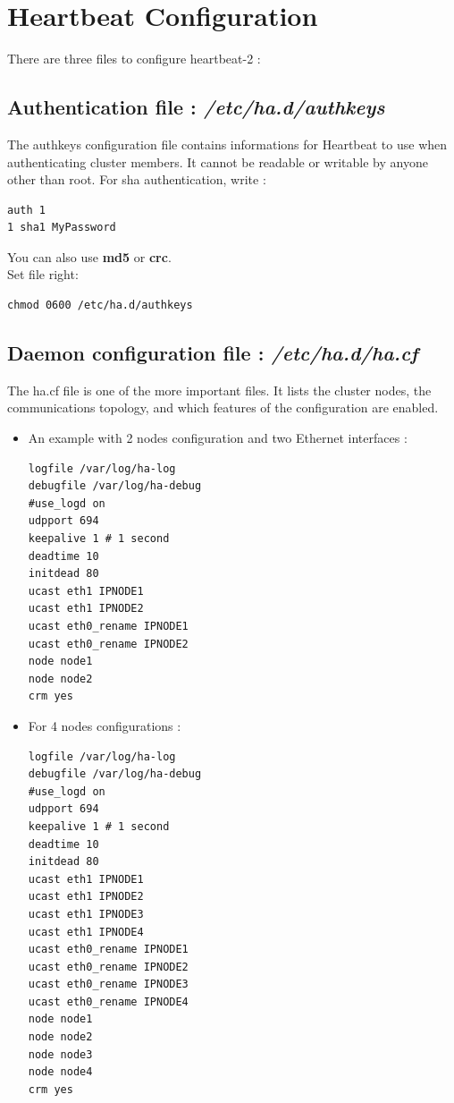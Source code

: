 \documentclass[a4paper,10pt]{report}
\begin{document}
\section{Heartbeat Configuration}

There are three files to configure heartbeat-2 :
\subsection{Authentication file : \textit{/etc/ha.d/authkeys}}
The authkeys configuration file contains informations for Heartbeat to use when authenticating cluster members. It cannot be readable or writable by anyone other than root. For sha authentication, write :
\begin{lstlisting}
auth 1
1 sha1 MyPassword
\end{lstlisting}
You can also use \textbf{md5} or \textbf{crc}.\\
Set file right:
\begin{lstlisting}
chmod 0600 /etc/ha.d/authkeys
\end{lstlisting}

\subsection{Daemon configuration file : \textit{/etc/ha.d/ha.cf}}

The ha.cf file is one of the more important files. It lists the cluster nodes, the communications topology, and which features of the configuration are enabled. 
\begin{itemize}
\item An example with 2 nodes configuration and two Ethernet interfaces :
\begin{lstlisting}
logfile /var/log/ha-log
debugfile /var/log/ha-debug
#use_logd on
udpport 694
keepalive 1 # 1 second
deadtime 10
initdead 80
ucast eth1 IPNODE1
ucast eth1 IPNODE2
ucast eth0_rename IPNODE1
ucast eth0_rename IPNODE2
node node1
node node2
crm yes
\end{lstlisting}

\item For 4 nodes configurations :
\begin{lstlisting}
logfile /var/log/ha-log
debugfile /var/log/ha-debug
#use_logd on
udpport 694
keepalive 1 # 1 second
deadtime 10
initdead 80
ucast eth1 IPNODE1
ucast eth1 IPNODE2
ucast eth1 IPNODE3
ucast eth1 IPNODE4
ucast eth0_rename IPNODE1
ucast eth0_rename IPNODE2
ucast eth0_rename IPNODE3
ucast eth0_rename IPNODE4
node node1
node node2
node node3
node node4
crm yes
\end{lstlisting}
\end{itemize}
\end{document}
